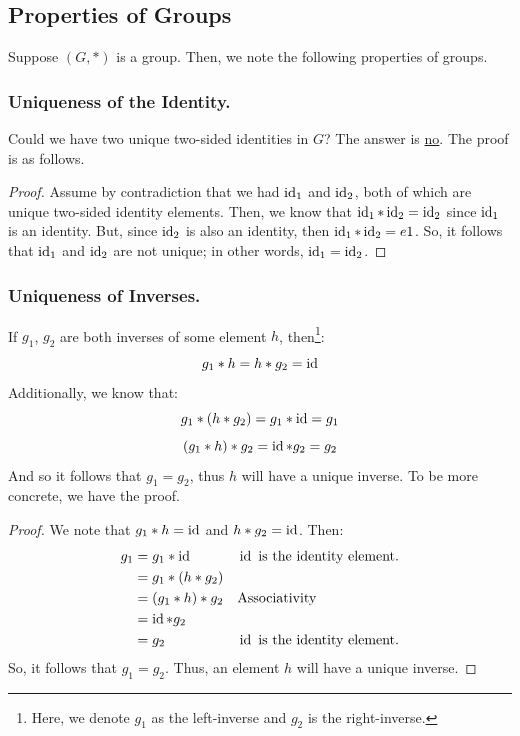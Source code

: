 \documentclass[letterpaper]{article}
\begin{document}
\subsection{Properties of Groups}
Suppose $(G, *)$ is a group. Then, we note the following properties of groups. 

\subsubsection{Uniqueness of the Identity.} 
Could we have two unique two-sided identities in $G$? The answer is \underline{no}. The proof is as follows. 

\begin{mdframed}
    \begin{proof}
        Assume by contradiction that we had $\operatorname{id}_1$ and $\operatorname{id}_2$, both of which are unique two-sided identity elements. Then, we know that $\operatorname{id}_1 * \operatorname{id}_2 = \operatorname{id}_2$ since $\operatorname{id}_1$ is an identity. But, since $\operatorname{id}_2$ is also an identity, then $\operatorname{id}_1 * \operatorname{id}_2 = e1$. So, it follows that $\operatorname{id}_1$ and $\operatorname{id}_2$ are not unique; in other words, $\operatorname{id}_1 = \operatorname{id}_2$. 
    \end{proof}
\end{mdframed}

\subsubsection{Uniqueness of Inverses.}

If $g_1$, $g_2$ are both inverses of some element $h$, then\footnote{Here, we denote $g_1$ as the left-inverse and $g_2$ is the right-inverse.}:
\[g_1 * h = h * g_2 = \operatorname{id}\]
Additionally, we know that:
\[g_1 * (h * g_2) = g_1 * \operatorname{id} = g_1\]
\[(g_1 * h) * g_2 = \operatorname{id} * g_2 = g_2\]
And so it follows that $g_1 = g_2$, thus $h$ will have a unique inverse. To be more concrete, we have the proof. 
\begin{mdframed}
    \begin{proof}
        We note that $g_1 * h = \operatorname{id}$ and $h * g_2 = \operatorname{id}$. Then:
        \begin{equation*}
            \begin{aligned}
                g_1 &= g_1 * \operatorname{id} && \operatorname{id} \text{ is the identity element.} \\ 
                    &= g_1 * (h * g_2) \\ 
                    &= (g_1 * h) * g_2 && \text{Associativity} \\ 
                    &= \operatorname{id} * g_2 \\ 
                    &= g_2 && \operatorname{id} \text{ is the identity element.}
            \end{aligned}
        \end{equation*}
        So, it follows that $g_1 = g_2$. Thus, an element $h$ will have a unique inverse. 
    \end{proof}
\end{mdframed}
\end{document}

